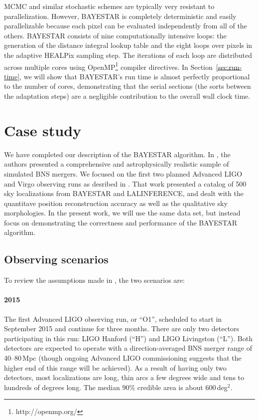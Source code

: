 \documentclass[amsmath,amssymb,aps,prx,reprint,nopreprintnumbers,nofootinbib]{revtex4-1}
\begin{document}
\ac{MCMC} and similar stochastic schemes are typically very resistant to parallelization. However, \ac{BAYESTAR} is completely deterministic and easily parallelizable because each pixel can be evaluated independently from all of the others. \ac{BAYESTAR} consists of nine computationally intensive loops: the generation of the distance integral lookup table and the eight loops over pixels in the adaptive HEALPix sampling step. The iterations of each loop are distributed across multiple cores using OpenMP\footnote{http://openmp.org/} compiler directives. In Section~\ref{sec:run-time}, we will show that \ac{BAYESTAR}'s run time is almost perfectly proportional to the number of cores, demonstrating that the serial sections (the sorts between the adaptation steps) are a negligible contribution to the overall wall clock time.

\section{Case study}
\label{sec:case-study}

We have completed our description of the \ac{BAYESTAR} algorithm. In \cite{FirstTwoYears}, the authors presented a comprehensive and astrophysically realistic sample of simulated \ac{BNS} mergers. We focused on the first two planned Advanced LIGO and Virgo observing runs as desribed in \cite{LIGOObservingScenarios}. That work presented a catalog of 500 sky localizations from \ac{BAYESTAR} and LALINFERENCE, and dealt with the quantitave position reconstruction accuracy as well as the qualitative sky morphologies. In the present work, we will use the same data set, but instead focus on demonstrating the correctness and performance of the \ac{BAYESTAR} algorithm.

\subsection{Observing scenarios}

To review the assumptions made in \cite{FirstTwoYears}, the two scenarios are:

\paragraph*{2015} The first Advanced \acs{LIGO} observing run, or ``O1'', scheduled to start in September 2015 and continue for three months. There are only two detectors participating in this run: \acs{LIGO} Hanford (``H'') and \acs{LIGO} Livingston (``L''). Both detectors are expected to operate with a direction\nobreakdashes-averaged \ac{BNS} merger range of 40\nobreakdashes--80\,Mpc (though ongoing Advanced \acs{LIGO} commissioning suggests that the higher end of this range will be achieved). As a result of having only two detectors, most localizations are long, thin arcs a few degrees wide and tens to hundreds of degrees long. The median 90\% credible area is about 600\,deg$^2$.
\end{document}
